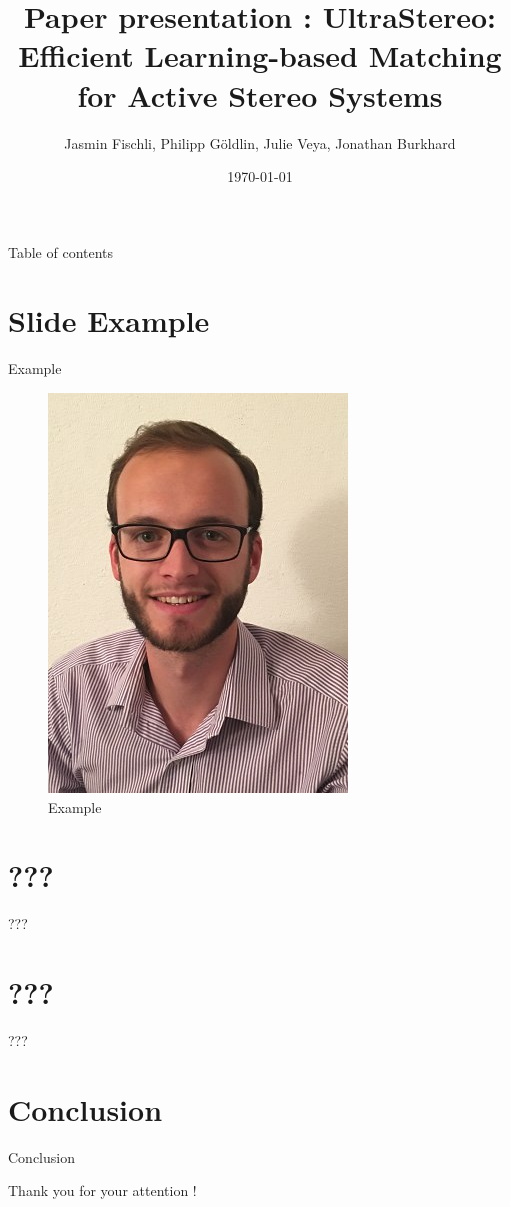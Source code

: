 \documentclass{beamer}
\author{Jasmin Fischli, Philipp Göldlin, Julie Veya, Jonathan Burkhard}
\title{Paper presentation : UltraStereo: Efficient Learning-based Matching for Active Stereo Systems}
\date{\today}
\begin{document}
\frame{\maketitle}
\begin{frame}{Table of contents}{}
	\tableofcontents
\end{frame}

\section{Slide Example}
\begin{frame}{Example}

\begin{figure}
\includegraphics[scale=0.25]{pictures/polop}

\caption{Example}
\end{figure}
\end{frame}

\section{???}
\begin{frame}{???}

\end{frame}

\section{???}
\begin{frame}{???}
\end{frame}

\section{Conclusion}
\begin{frame}{Conclusion}
\end{frame}

\begin{frame}{}
\centering
\Huge{Thank you for your attention !}
\end{frame}
\end{document}
